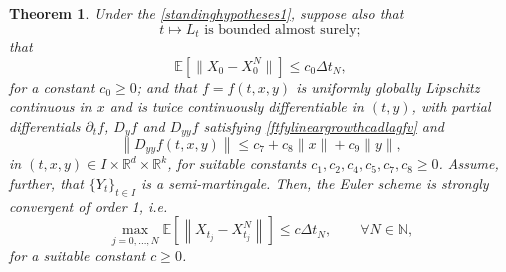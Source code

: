 \documentclass[reqno,12pt]{amsart}
\theoremstyle{plain} %
\newtheorem{theorem}{Theorem}[section]
\theoremstyle{definition} %
\begin{document}
\begin{theorem}
    \label{thmsemimartingale}
    Under the \cref{standinghypotheses1}, suppose also that
    \begin{equation}
        t \mapsto L_t \textrm{ is bounded almost surely};
    \end{equation}
    that 
    \begin{equation}
        \mathbb{E}\left[\|X_0 - X_0^N\|\right] \leq c_0\Delta t_N,
    \end{equation}
    for a constant $c_0 \geq 0$; and that $f=f(t, x, y)$ is uniformly globally Lipschitz continuous in $x$ and is twice continuously differentiable in $(t, y)$, with partial differentials $\partial_t f$, $D_y f$ and $D_{yy} f$ satisfying \eqref{ftfylineargrowthcadlagfv} and
    \begin{equation}
        \label{ftfylineargrowthsemimartingale}
        \left\|D_{yy} f(t, x, y)\right\| \leq c_7 + c_8\|x\| + c_9\|y\|,
    \end{equation}
    in $(t, x, y)\in I\times \mathbb{R}^d\times \mathbb{R}^k$, for suitable constants $c_1, c_2, c_4, c_5, c_7, c_8 \geq 0$. Assume, further, that $\{Y_t\}_{t\in I}$ is a semi-martingale. Then, the Euler scheme is strongly convergent of order 1, i.e.
    \begin{equation}
        \label{ordersemimartingale}
        \max_{j=0, \ldots, N} \mathbb{E}\left[\left\| X_{t_j} - X_{t_j}^N \right\|\right] \leq c \Delta t_N, \qquad \forall N \in \mathbb{N},
    \end{equation}
    for a suitable constant $c\geq 0$.
\end{theorem}
\end{document}
